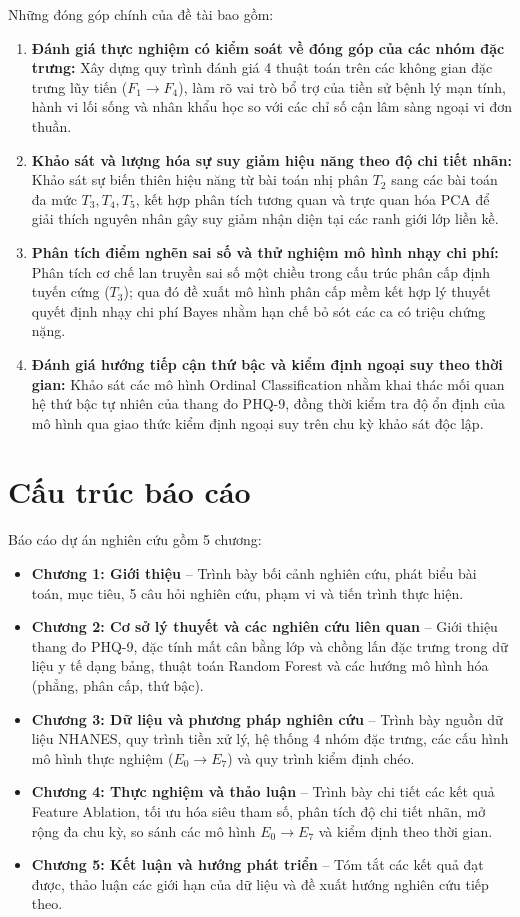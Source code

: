 Những đóng góp chính của đề tài bao gồm:
\begin{enumerate}
    \item \textbf{Đánh giá thực nghiệm có kiểm soát về đóng góp của các nhóm đặc trưng:} Xây dựng quy trình đánh giá 4 thuật toán trên các không gian đặc trưng lũy tiến ($F_1 \to F_4$), làm rõ vai trò bổ trợ của tiền sử bệnh lý mạn tính, hành vi lối sống và nhân khẩu học so với các chỉ số cận lâm sàng ngoại vi đơn thuần.
    \item \textbf{Khảo sát và lượng hóa sự suy giảm hiệu năng theo độ chi tiết nhãn:} Khảo sát sự biến thiên hiệu năng từ bài toán nhị phân $T_2$ sang các bài toán đa mức $T_3, T_4, T_5$, kết hợp phân tích tương quan và trực quan hóa PCA để giải thích nguyên nhân gây suy giảm nhận diện tại các ranh giới lớp liền kề.
    \item \textbf{Phân tích điểm nghẽn sai số và thử nghiệm mô hình nhạy chi phí:} Phân tích cơ chế lan truyền sai số một chiều trong cấu trúc phân cấp định tuyến cứng ($T_3$); qua đó đề xuất mô hình phân cấp mềm kết hợp lý thuyết quyết định nhạy chi phí Bayes nhằm hạn chế bỏ sót các ca có triệu chứng nặng.
    \item \textbf{Đánh giá hướng tiếp cận thứ bậc và kiểm định ngoại suy theo thời gian:} Khảo sát các mô hình Ordinal Classification nhằm khai thác mối quan hệ thứ bậc tự nhiên của thang đo PHQ-9, đồng thời kiểm tra độ ổn định của mô hình qua giao thức kiểm định ngoại suy trên chu kỳ khảo sát độc lập.
\end{enumerate}

\section{Cấu trúc báo cáo}
\label{sec:bo-cuc-khoa-luan}

Báo cáo dự án nghiên cứu gồm 5 chương:
\begin{itemize}
    \item \textbf{Chương 1: Giới thiệu} -- Trình bày bối cảnh nghiên cứu, phát biểu bài toán, mục tiêu, 5 câu hỏi nghiên cứu, phạm vi và tiến trình thực hiện.
    \item \textbf{Chương 2: Cơ sở lý thuyết và các nghiên cứu liên quan} -- Giới thiệu thang đo PHQ-9, đặc tính mất cân bằng lớp và chồng lấn đặc trưng trong dữ liệu y tế dạng bảng, thuật toán Random Forest và các hướng mô hình hóa (phẳng, phân cấp, thứ bậc).
    \item \textbf{Chương 3: Dữ liệu và phương pháp nghiên cứu} -- Trình bày nguồn dữ liệu NHANES, quy trình tiền xử lý, hệ thống 4 nhóm đặc trưng, các cấu hình mô hình thực nghiệm ($E_0 \to E_7$) và quy trình kiểm định chéo.
    \item \textbf{Chương 4: Thực nghiệm và thảo luận} -- Trình bày chi tiết các kết quả Feature Ablation, tối ưu hóa siêu tham số, phân tích độ chi tiết nhãn, mở rộng đa chu kỳ, so sánh các mô hình $E_0 \to E_7$ và kiểm định theo thời gian.
    \item \textbf{Chương 5: Kết luận và hướng phát triển} -- Tóm tắt các kết quả đạt được, thảo luận các giới hạn của dữ liệu và đề xuất hướng nghiên cứu tiếp theo.
\end{itemize}
